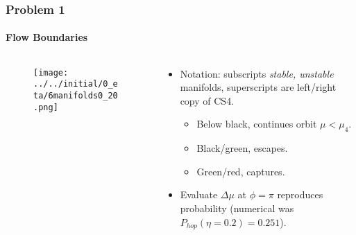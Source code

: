 \documentclass[dvipsnames, 11pt]{beamer}
\begin{document}
\begin{frame}
    \frametitle{Problem 1}
    \framesubtitle{Flow Boundaries}

    \begin{columns}
        \begin{column}{0.5\textwidth}
            \begin{figure}[t]
                \centering
                \texttt{[image: ../../initial/0\_eta/6manifolds0\_20.png]}
            \end{figure}
        \end{column}
        \begin{column}{0.5\textwidth}
            \begin{itemize}
                \item Notation: subscripts \emph{stable, unstable} manifolds,
                    superscripts are left/right copy of CS4.

                    \begin{itemize}
                        \item Below black, continues orbit $\mu < \mu_4$.

                        \item Black/green, escapes.

                        \item Green/red, captures.
                    \end{itemize}

                \item Evaluate $\Delta \mu$ at $\phi = \pi$ reproduces
                    probability (numerical was $P_{hop}(\eta = 0.2) = 0.251$).
            \end{itemize}
        \end{column}
    \end{columns}
\end{frame}
\end{document}
